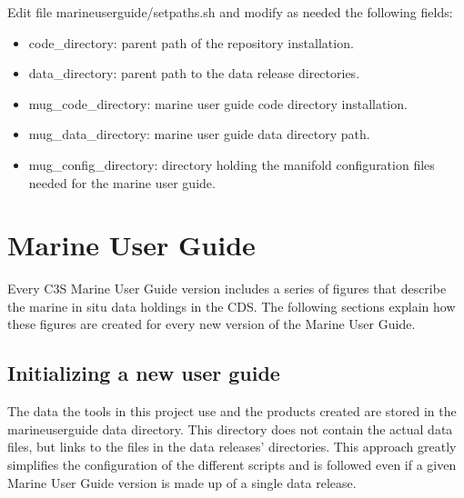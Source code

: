 \documentclass[letterpaper,10pt,english]{sphinxmanual}
\begin{document}
Edit file marine\sphinxhyphen{}user\sphinxhyphen{}guide/setpaths.sh and modify as needed the following fields:
\begin{itemize}
\item {} 
code\_directory: parent path of the repository installation.

\item {} 
data\_directory: parent path to the data release directories.

\item {} 
mug\_code\_directory: marine user guide code directory installation.

\item {} 
mug\_data\_directory: marine user guide data directory path.

\item {} 
mug\_config\_directory: directory holding the manifold configuration files needed for the marine user guide.

\end{itemize}


\chapter{Marine User Guide}
\label{\detokenize{index:marine-user-guide}}\label{\detokenize{index:id2}}
Every C3S Marine User Guide version includes a series of figures that describe
the marine in situ data holdings in the CDS. The following sections explain how
these figures are created for every new version of the Marine User Guide.


\section{Initializing a new user guide}
\label{\detokenize{index:initializing-a-new-user-guide}}\label{\detokenize{index:init-mug}}

\label{\detokenize{index:data-directory-setup}}
The data the tools in this project use and the products created are stored in the marine\sphinxhyphen{}user\sphinxhyphen{}guide data directory.
 This directory does not contain the actual data files, but links to the files in the data releases’ directories. 
 This approach greatly simplifies the configuration of the different scripts and is followed even if a given Marine User Guide version is made up of a single data release.
\end{document}
